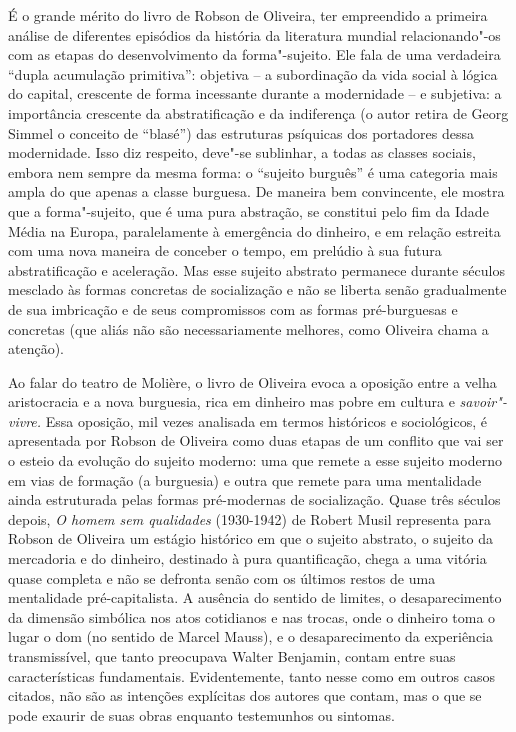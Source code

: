 É o grande mérito do livro de Robson de Oliveira, ter empreendido a
primeira análise de diferentes episódios da história da literatura
mundial relacionando"-os com as etapas do desenvolvimento da
forma"-sujeito. Ele fala de uma verdadeira ``dupla acumulação
primitiva'': objetiva -- a subordinação da vida social à lógica do
capital, crescente de forma incessante durante a modernidade -- e
subjetiva: a importância crescente da abstratificação e da indiferença
(o autor retira de Georg Simmel o conceito de ``blasé'') das estruturas
psíquicas dos portadores dessa modernidade. Isso diz respeito, deve"-se
sublinhar, a todas as classes sociais, embora nem sempre da mesma forma:
o ``sujeito burguês'' é uma categoria mais ampla do que apenas a classe
burguesa. De maneira bem convincente, ele mostra que a forma"-sujeito,
que é uma pura abstração, se constitui pelo fim da Idade Média na
Europa, paralelamente à emergência do dinheiro, e em relação estreita
com uma nova maneira de conceber o tempo, em prelúdio à sua futura
abstratificação e aceleração. Mas esse sujeito abstrato permanece
durante séculos mesclado às formas concretas de socialização e não se
liberta senão gradualmente de sua imbricação e de seus compromissos com
as formas pré-burguesas e concretas (que aliás não são necessariamente
melhores, como Oliveira chama a atenção).

Ao falar do teatro de Molière, o livro de Oliveira evoca a oposição
entre a velha aristocracia e a nova burguesia, rica em dinheiro mas
pobre em cultura e \emph{savoir"-vivre.} Essa oposição, mil vezes
analisada em termos históricos e sociológicos, é apresentada por Robson
de Oliveira como duas etapas de um conflito que vai ser o esteio da
evolução do sujeito moderno: uma que remete a esse sujeito moderno em
vias de formação (a burguesia) e outra que remete para uma mentalidade
ainda estruturada pelas formas pré-modernas de socialização. Quase três
séculos depois, \emph{O homem sem qualidades} (1930-1942) de Robert
Musil representa para Robson de Oliveira um estágio histórico em que o
sujeito abstrato, o sujeito da mercadoria e do dinheiro, destinado à
pura quantificação, chega a uma vitória quase completa e não se defronta
senão com os últimos restos de uma mentalidade pré-capitalista. A
ausência do sentido de limites, o desaparecimento da dimensão simbólica
nos atos cotidianos e nas trocas, onde o dinheiro toma o lugar o dom (no
sentido de Marcel Mauss), e o desaparecimento da experiência
transmissível, que tanto preocupava Walter Benjamin, contam entre suas
características fundamentais. Evidentemente, tanto nesse como em outros
casos citados, não são as intenções explícitas dos autores que contam,
mas o que se pode exaurir de suas obras enquanto testemunhos ou
sintomas.

